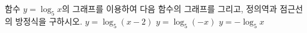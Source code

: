 함수 $y=\log_5 x$의 그래프를 이용하여 다음 함수의 그래프를 그리고, 정의역과 점근선의 방정식을 구하시오.
 $y=\log_5 (x-2)$
 $y=\log_5 (-x)$
 $y=-\log_5 x$
